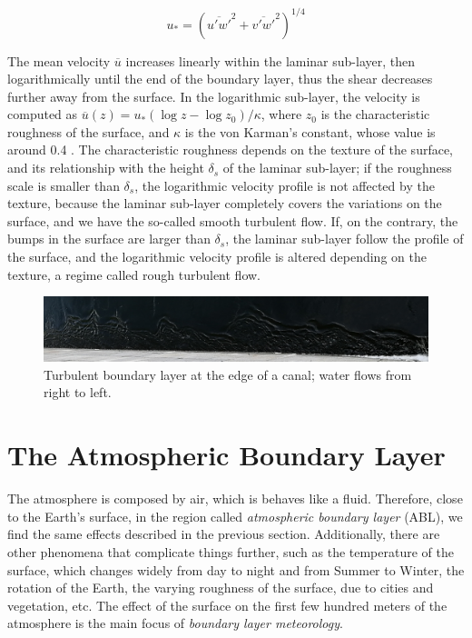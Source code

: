 \documentclass[a4paper]{book}
\begin{document}
\begin{equation}
\label{eq:ustar_momentum}
u_*=\left(\overline{u'w'}^2+\overline{v'w'}^2\right)^{1/4}
\end{equation}

The mean velocity $\overline{u}$ increases linearly within the laminar sub-layer, then logarithmically until the end of the boundary layer, thus the shear decreases further away from the surface. In the logarithmic sub-layer, the velocity is computed as $\overline{u}(z)=u_*(\log z - \log z_0)/\kappa$, where $z_0$ is the characteristic roughness of the surface, and $\kappa$ is the von Karman's constant, whose value is around 0.4 \cite{basicatm}. The characteristic roughness depends on the texture of the surface, and its relationship with the height $\delta_s$ of the laminar sub-layer; if the roughness scale is smaller than $\delta_s$, the logarithmic velocity profile is not affected by the texture, because the laminar sub-layer completely covers the variations on the surface, and we have the so-called smooth turbulent flow. If, on the contrary, the bumps in the surface are larger than $\delta_s$, the laminar sub-layer follow the profile of the surface, and the logarithmic velocity profile is altered depending on the texture, a regime called rough turbulent flow.

\begin{figure}
\caption{Turbulent boundary layer at the edge of a canal; water flows from right to left.}
\label{fig:bl}
\centering
\includegraphics[width=\textwidth]{images/bl}
\end{figure}

\section{The Atmospheric Boundary Layer}
\label{sec:abl}
The atmosphere is composed by air, which is behaves like a fluid. Therefore, close to the Earth's surface, in the region called \emph{atmospheric boundary layer} (ABL), we find the same effects described in the previous section. Additionally, there are other phenomena that complicate things further, such as the temperature of the surface, which changes widely from day to night and from Summer to Winter, the rotation of the Earth, the varying roughness of the surface, due to cities and vegetation, etc. The effect of the surface on the first few hundred meters of the atmosphere is the main focus of \emph{boundary layer meteorology}. 
\end{document}
